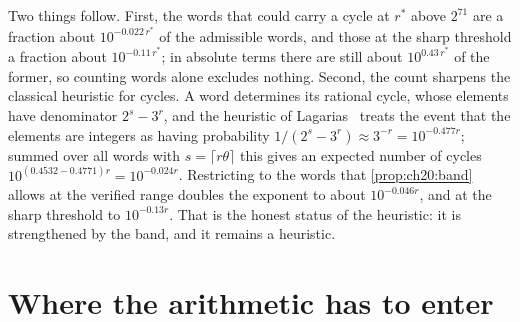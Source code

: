 Two things follow. First, the words that could carry a cycle at $r^\ast$ above $2^{71}$ are a fraction about $10^{-0.022\,r^\ast}$ of the admissible words, and those at the sharp threshold a fraction about $10^{-0.11\,r^\ast}$; in absolute terms there are still about $10^{0.43\,r^\ast}$ of the former, so counting words alone excludes nothing. Second, the count sharpens the classical heuristic for cycles. A word determines its rational cycle, whose elements have denominator $2^s-3^r$, and the heuristic of Lagarias~\cite{lagarias1985} treats the event that the elements are integers as having probability $1/(2^s-3^r)\approx3^{-r}=10^{-0.477r}$; summed over all words with $s=\lceil r\theta\rceil$ this gives an expected number of cycles $10^{(0.4532-0.4771)r}=10^{-0.024r}$. Restricting to the words that \cref{prop:ch20:band} allows at the verified range doubles the exponent to about $10^{-0.046r}$, and at the sharp threshold to $10^{-0.13r}$. That is the honest status of the heuristic: it is strengthened by the band, and it remains a heuristic.

\section{Where the arithmetic has to enter}\label{sec:ch20:arith}

